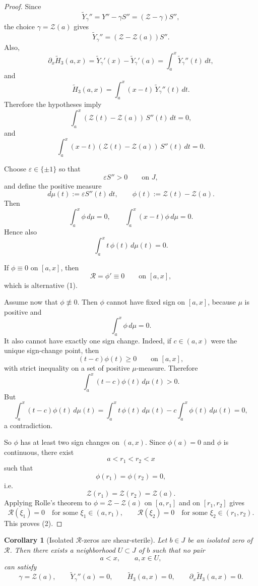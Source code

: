 \documentclass[11pt,a4paper]{amsart}
\theoremstyle{plain}
\newtheorem{corollary}[theorem]{Corollary}
\theoremstyle{definition}
\begin{document}
\begin{proof}
Since
\[
\widetilde Y_\gamma''=Y''-\gamma S''=(\mathcal Z-\gamma)S'',
\]
the choice $\gamma=\mathcal Z(a)$ gives
\[
\widetilde Y_\gamma''=(\mathcal Z-\mathcal Z(a))S''.
\]
Also,
\[
\partial_x\widetilde H_3(a,x)
=
\widetilde Y_\gamma'(x)-\widetilde Y_\gamma'(a)
=
\int_a^x \widetilde Y_\gamma''(t)\,dt,
\]
and
\[
\widetilde H_3(a,x)
=
\int_a^x (x-t)\,\widetilde Y_\gamma''(t)\,dt.
\]
Therefore the hypotheses imply
\[
\int_a^x (\mathcal Z(t)-\mathcal Z(a))\,S''(t)\,dt=0,
\]
and
\[
\int_a^x (x-t)(\mathcal Z(t)-\mathcal Z(a))\,S''(t)\,dt=0.
\]

Choose $\varepsilon\in\{\pm1\}$ so that
\[
\varepsilon S''>0
\qquad\text{on }J,
\]
and define the positive measure
\[
d\mu(t):=\varepsilon S''(t)\,dt,
\qquad
\phi(t):=\mathcal Z(t)-\mathcal Z(a).
\]
Then
\[
\int_a^x \phi\,d\mu=0,
\qquad
\int_a^x (x-t)\phi\,d\mu=0.
\]
Hence also
\[
\int_a^x t\,\phi(t)\,d\mu(t)=0.
\]

If $\phi\equiv 0$ on $[a,x]$, then
\[
\mathcal R=\phi'\equiv 0
\qquad\text{on }[a,x],
\]
which is alternative (1).

Assume now that $\phi\not\equiv 0$. Then $\phi$ cannot have fixed sign on
$[a,x]$, because $\mu$ is positive and
\[
\int_a^x \phi\,d\mu=0.
\]
It also cannot have exactly one sign change. Indeed, if $c\in(a,x)$ were the
unique sign-change point, then
\[
(t-c)\phi(t)\ge 0
\qquad\text{on }[a,x],
\]
with strict inequality on a set of positive $\mu$-measure. Therefore
\[
\int_a^x (t-c)\phi(t)\,d\mu(t)>0.
\]
But
\[
\int_a^x (t-c)\phi(t)\,d\mu(t)
=
\int_a^x t\,\phi(t)\,d\mu(t)
-c\int_a^x \phi(t)\,d\mu(t)
=0,
\]
a contradiction.

So $\phi$ has at least two sign changes on $(a,x)$. Since $\phi(a)=0$ and
$\phi$ is continuous, there exist
\[
a<r_1<r_2<x
\]
such that
\[
\phi(r_1)=\phi(r_2)=0,
\]
i.e.
\[
\mathcal Z(r_1)=\mathcal Z(r_2)=\mathcal Z(a).
\]
Applying Rolle's theorem to $\phi=\mathcal Z-\mathcal Z(a)$ on $[a,r_1]$ and on
$[r_1,r_2]$ gives
\[
\mathcal R(\xi_1)=0
\quad\text{for some }\xi_1\in(a,r_1),
\qquad
\mathcal R(\xi_2)=0
\quad\text{for some }\xi_2\in(r_1,r_2).
\]
This proves (2).
\end{proof}

\begin{corollary}[Isolated $\mathcal R$-zeros are shear-sterile]
\label{cor:isolated-R-zeros-are-shear-sterile}
Let $b\in J$ be an isolated zero of $\mathcal R$. Then there exists a
neighborhood $U\subset J$ of $b$ such that no pair
\[
a<x,
\qquad
a,x\in U,
\]
can satisfy
\[
\gamma=\mathcal Z(a),
\qquad
\widetilde Y_\gamma''(a)=0,
\qquad
\widetilde H_3(a,x)=0,
\qquad
\partial_x\widetilde H_3(a,x)=0.
\]
\end{corollary}
\end{document}
